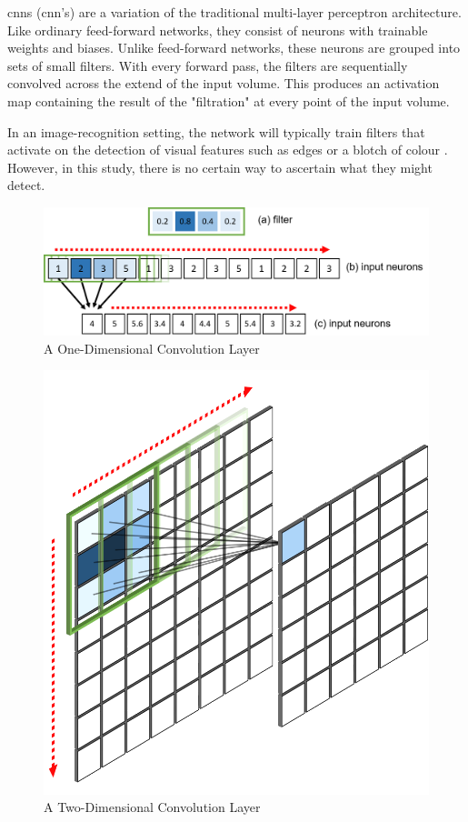\documentclass[11pt,oneside,openany,a4paper,english, report, goldenblock
]{usthesis}
\begin{document}
\acrlong{cnn}s (\acrshort{cnn}'s) are a variation of the traditional multi-layer perceptron architecture. Like ordinary feed-forward networks, they consist of neurons with trainable weights and biases. Unlike feed-forward networks, these neurons are grouped into sets of small filters. With every forward pass, the filters are sequentially convolved across the extend of the input volume. This produces an activation map containing the result of the "filtration" at every point of the input volume.

In an image-recognition setting, the network will typically train filters that activate on the detection of visual features such as edges or a blotch of colour \citep{cs231n}. However, in this study, there is no certain way to ascertain what they might detect.

\begin{figure}[h]
	\centering
	\includegraphics[width=0.9\linewidth]{Images/Diagrams/1D_Convolution}
	\caption[1D Convolutional Layer]{A One-Dimensional Convolution Layer}
	\label{fig:1dconvolution}
\end{figure}

\begin{figure}[h]
	\centering
	\includegraphics[width=0.4\linewidth]{Images/Diagrams/2D_Convolution}
	\caption[2D Convolution Layer]{A Two-Dimensional Convolution Layer}
	\label{fig:2dconvolution}
\end{figure}
\end{document}
